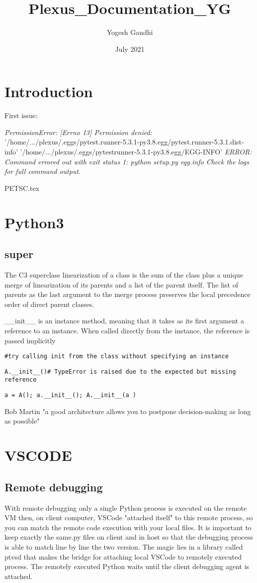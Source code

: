 \documentclass{article}
\title{Plexus_Documentation_YG}
\author{Yogesh Gandhi}
\date{July 2021}
\begin{document}
\section{Introduction}
First issue:

\textit{PermissionError: [Errno 13] Permission denied:}
'/home/.../plexus/.eggs/pytest.runner-5.3.1-py3.8.egg/pytest.runner-5.3.1.dist-info' '/home/.../plexus/.eggs/pytestrunner-5.3.1-py3.8.egg/EGG-INFO'
\textit{ERROR: Command errored out with exit status 1: python setup.py egg.info Check the logs for full command output.}

{PETSC.tex}

\section{Python3}
\subsection{super}
The C3 superclass linearization of a class is the sum of the class plus a unique merge of linearization of its parents and a list of the parent itself. The list of parents as the last argument to the merge process preserves the local precedence order of direct parent classes.

\_\_init\_\_ is an instance method, meaning that it takes as its first argument a reference to an instance. When called directly from the instance, the reference is passed implicitly

\texttt{\#try calling init from the class without specifying an instance}

\texttt{A.\_\_init\_\_()\# TypeError is raised due to the expected but missing reference}

\texttt{a = A(); a.\_\_init\_\_(); A.\_\_init\_\_(a  )}


Bob Martin "a good architecture allows you to postpone decision-making as long as possible"
\section{VSCODE}
\subsection*{Remote debugging}
With remote debugging only a single Python process is executed on the remote VM then, on client computer, VSCode "attached itself" to this remote process, so you can match the remote code execution with your local files. It is important to keep exactly the same.py files on client and in host so that the debugging process is able to match line by line the two version.
The magic lies in a library called ptvsd that makes the bridge for attaching local VSCode to remotely executed process. The remotely executed Python waits until the client debugging agent is attached.
\end{document}
